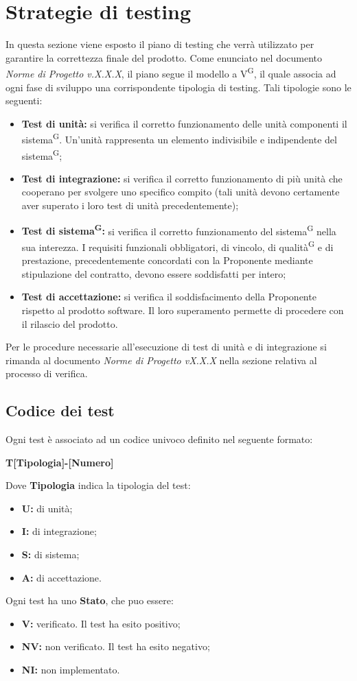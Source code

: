 \documentclass[8pt]{article}
\newcommand{\glossterm}[1]{#1\textsuperscript{G}} %
\begin{document}
\section{Strategie di testing}
In questa sezione viene esposto il piano di testing che verrà utilizzato per garantire la correttezza finale del prodotto. Come enunciato nel documento \textit{Norme di Progetto v.X.X.X}, il piano segue il modello a \glossterm{V}, il quale associa ad ogni fase di sviluppo una corrispondente tipologia di testing. Tali tipologie sono le seguenti:
\begin{itemize}
	\item \textbf{Test di unità:} si verifica il corretto funzionamento delle unità componenti il \glossterm{sistema}. Un’unità rappresenta un elemento indivisibile e indipendente del \glossterm{sistema}; 
	\item \textbf{Test di integrazione:} si verifica il corretto funzionamento di più unità che cooperano per svolgere uno specifico compito (tali unità devono certamente aver superato i loro test di unità precedentemente);
	\item \textbf{\glossterm{Test di sistema}:} si verifica il corretto funzionamento del \glossterm{sistema} nella sua interezza. I requisiti funzionali obbligatori, di vincolo, di \glossterm{qualità} e di prestazione, precedentemente concordati con la Proponente mediante stipulazione del contratto, devono essere soddisfatti per intero;
	\item \textbf{Test di accettazione:} si verifica il soddisfacimento della Proponente rispetto al prodotto software. Il loro superamento permette di procedere con il rilascio del prodotto.
\end{itemize}
Per le procedure necessarie all’esecuzione di test di unità e di integrazione si rimanda al documento \textit{Norme di Progetto vX.X.X} nella sezione relativa al processo di verifica.
\subsection{Codice dei test}
Ogni test è associato ad un codice univoco definito nel seguente formato:
\begin{center}
	\textbf{T[Tipologia]-[Numero]}
\end{center}
Dove \textbf{Tipologia} indica la tipologia del test: 
\begin{itemize}
    \item \textbf{U:} di unit\`{a};
	\item \textbf{I:} di integrazione;
	\item \textbf{S:} di sistema;
	\item \textbf{A:} di accettazione.
\end{itemize}
Ogni test ha uno \textbf{Stato}, che puo essere:
\begin{itemize}
	\item \textbf{V:} verificato. Il test ha esito positivo;
	\item \textbf{NV:} non verificato. Il test ha esito negativo; 
	\item \textbf{NI:} non implementato.
\end{itemize}
\clearpage
\end{document}

